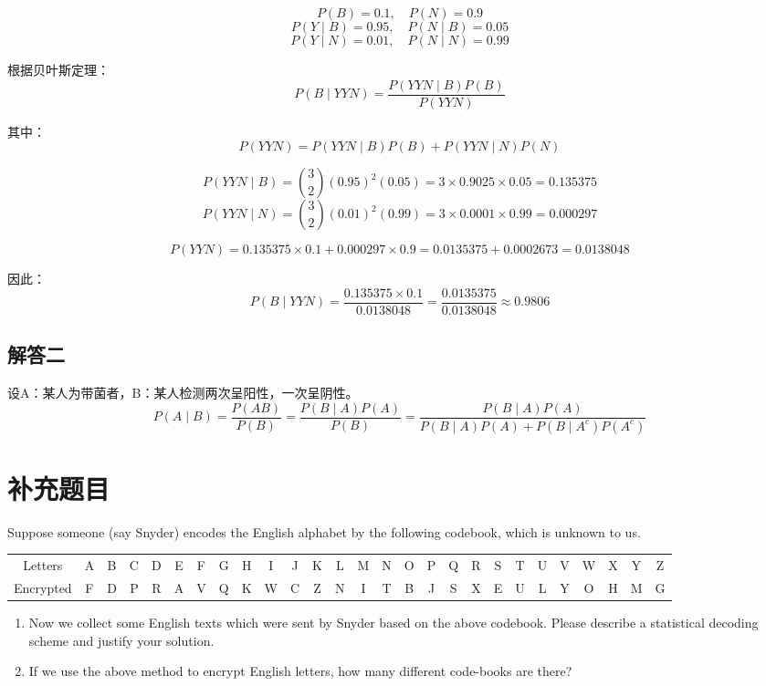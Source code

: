 \documentclass[UTF8]{report}
\theoremstyle{MyLineTheoremStyle} %
\theoremstyle{MyBlockTheoremStyle} %
\theoremstyle{MySubsubsectionStyle} %
\begin{document}
\[
P(B) = 0.1, \quad P(N) = 0.9
\]
\[
P(Y \mid B) = 0.95, \quad P(N \mid B) = 0.05
\]
\[
P(Y \mid N) = 0.01, \quad P(N \mid N) = 0.99
\]

根据贝叶斯定理：
\[
P(B \mid YYN) = \frac{P(YYN \mid B)P(B)}{P(YYN)}
\]

其中：
\[
P(YYN) = P(YYN \mid B)P(B) + P(YYN \mid N)P(N)
\]

\[
P(YYN \mid B) = \binom{3}{2} (0.95)^2 (0.05) = 3 \times 0.9025 \times 0.05 = 0.135375
\]
\[
P(YYN \mid N) = \binom{3}{2} (0.01)^2 (0.99) = 3 \times 0.0001 \times 0.99 = 0.000297
\]

\[
P(YYN) = 0.135375 \times 0.1 + 0.000297 \times 0.9 = 0.0135375 + 0.0002673 = 0.0138048
\]

因此：
\[
P(B \mid YYN) = \frac{0.135375 \times 0.1}{0.0138048} = \frac{0.0135375}{0.0138048} \approx 0.9806
\]

\subsection*{解答二}

设A：某人为带菌者，B：某人检测两次呈阳性，一次呈阴性。
\[
P(A \mid B) = \frac{P(AB)}{P(B)} = \frac{P(B \mid A)P(A)}{P(B)} = \frac{P(B \mid A)P(A)}{P(B \mid A)P(A) + P(B \mid A^c)P(A^c)}
\]


\section{补充题目}

Suppose someone (say Snyder) encodes the English alphabet by the following codebook, which is unknown to us.
\begin{center}
\hspace*{-1.5cm}
\begin{tabular}{ccccccccccccccccccccccccccc}
Letters   & A & B & C & D & E & F & G & H & I & J & K & L & M & N & O & P & Q & R & S & T & U & V & W & X & Y & Z \\
Encrypted & F & D & P & R & A & V & Q & K & W & C & Z & N & I & T & B & J & S & X & E & U & L & Y & O & H & M & G 
\end{tabular}
\end{center}

\begin{enumerate}
    \item Now we collect some English texts which were sent by Snyder based on the above codebook. Please describe a statistical decoding scheme and justify your solution.
    \item If we use the above method to encrypt English letters, how many different code-books are there?
\end{enumerate}
\end{document}
